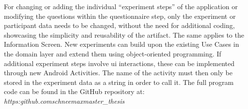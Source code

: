 
For changing or adding the individual \enquote{experiment steps} of the application or modifying the questions within the questionnaire step, only the experiment or participant data needs to be changed, without the need for additional coding, showcasing the simplicity and reusability of the artifact. The same applies to the Information Screen. New experiments can build upon the existing Use Cases in the domain layer and extend them using object-oriented programming. If additional experiment steps involve \ac{ui} interactions, these can be implemented through new Android Activities. The name of the activity must then only be stored in the experiment data as a string in order to call it. The full program code can be found in the GitHub repository at: \textit{https:\/\/github.com\/schneemax\/master\_thesis}
